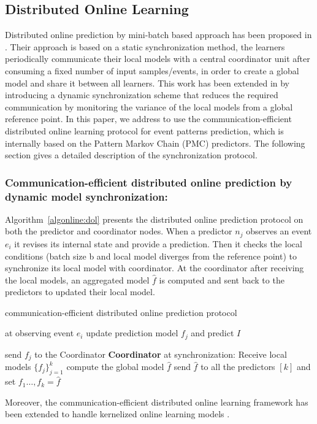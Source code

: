 \subsection{Distributed Online Learning}

Distributed online prediction by mini-batch based approach has been proposed in \cite{dekel2012optimal}. Their approach is based on a static synchronization method,  the learners periodically communicate  their local models with a central coordinator unit after consuming a fixed number of input samples/events, in order to  create a global model and share it between all learners. This work has been extended in \cite{kamp2014communication} by introducing a
dynamic synchronization scheme that reduces the required communication by monitoring the variance of the local models from a global reference point. In this paper, we address to use the communication-efficient distributed online learning protocol for event patterns prediction, which is internally based on the Pattern Markov Chain (PMC) predictors. The following section gives a detailed description of the synchronization protocol.
\subsubsection*{Communication-efficient distributed online prediction by dynamic model synchronization:\\}

Algorithm~\ref{algonline:dol} presents the distributed online prediction protocol on both the predictor and coordinator nodes. When a predictor $n_j$ observes an event $e_i$ it revises its internal state and provide a prediction. Then it checks the local conditions (batch size b and local model diverges from the reference point) to synchronize its local model with coordinator. At the coordinator after receiving the local models, an aggregated model $\hat{f}$ is computed and sent back to the predictors to updated their local model.

\begin{algorithm}
	\caption{communication-efficient distributed online prediction protocol} 
	\begin{algorithmic}[1] 
		 at observing event $e_i$
		\Statex \Indp update prediction model $f_{j}$ and predict $I$

		\Statex {}  
		\Statex send  $f_{j}$ to the Coordinator 
		\Statex \Indm \Indm \textbf{Coordinator} at synchronization:
		\Statex \Indp Receive local models $\{f_{j}\}_{j=1}^k$ 	
		\Statex  compute the global model $\hat{f}$ 
		\Statex send $\hat{f}$ to all the predictors $[k]$ and set $f_{1}\dots, f_{k}=\hat{f}$
	\end{algorithmic}
	\label{algonline:dol}
\end{algorithm}


Moreover, the communication-efficient distributed online learning framework has been extended to handle kernelized online learning models \cite{kamp2016communication}.
